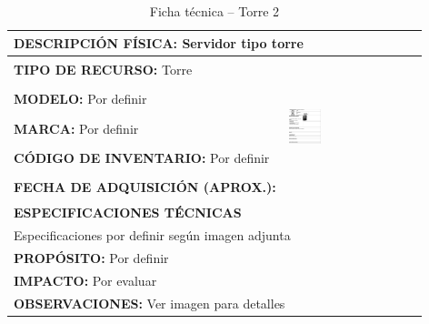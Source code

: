 \begin{table}[H]
\centering
\caption{Ficha técnica -- Torre 2}
\label{tab:torre-2}
\begin{tabular}{|p{}|p{}|}
\hline
\multicolumn{2}{|l|}{\textbf{DESCRIPCIÓN FÍSICA:} Servidor tipo torre} \\ \hline
\textbf{TIPO DE RECURSO:} Torre & 
\multirow{5}{*}{\includegraphics[width=0.25\textwidth,height=4cm,keepaspectratio]{tablas-images/cp1/torres/torre-2.png}} \\ \cline{1-1}
\textbf{MODELO:} Por definir & \\ \cline{1-1}
\textbf{MARCA:} Por definir & \\ \cline{1-1}
\textbf{CÓDIGO DE INVENTARIO:} Por definir & \\ \cline{1-1}
\textbf{FECHA DE ADQUISICIÓN (APROX.):} & \\ \hline
\multicolumn{2}{|l|}{\textbf{ESPECIFICACIONES TÉCNICAS}} \\ \hline
\multicolumn{2}{|p{0.95\textwidth}|}{
\footnotesize
Especificaciones por definir según imagen adjunta
} \\ \hline
\multicolumn{2}{|l|}{\textbf{PROPÓSITO:} Por definir} \\ \hline
\multicolumn{2}{|l|}{\textbf{IMPACTO:} Por evaluar} \\ \hline
\multicolumn{2}{|l|}{\textbf{OBSERVACIONES:} Ver imagen para detalles} \\ \hline
\end{tabular}
\end{table}

